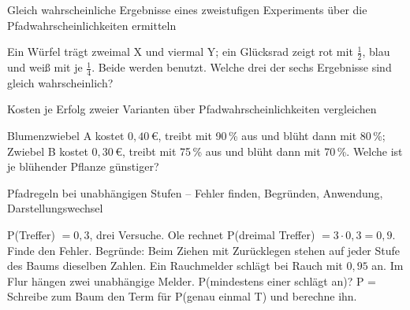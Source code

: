 \begin{aufgabe}{Gleich wahrscheinliche Ergebnisse eines zweistufigen Experiments über die Pfadwahrscheinlichkeiten ermitteln}
\begin{teile}
\teil Ein Würfel trägt zweimal X und viermal Y; ein Glücksrad zeigt rot mit $\frac{1}{2}$, blau und weiß mit je $\frac{1}{4}$. Beide werden benutzt. Welche drei der sechs Ergebnisse sind gleich wahrscheinlich?
\end{teile}
\end{aufgabe}

\begin{aufgabe}{Kosten je Erfolg zweier Varianten über Pfadwahrscheinlichkeiten vergleichen}
\begin{teile}
\teil Blumenzwiebel A kostet $0{,}40$\,€, treibt mit 90\,\% aus und blüht dann mit 80\,\%; Zwiebel B kostet $0{,}30$\,€, treibt mit 75\,\% aus und blüht dann mit 70\,\%. Welche ist je blühender Pflanze günstiger?
\end{teile}
\end{aufgabe}

\begin{aufgabe}{Pfadregeln bei unabhängigen Stufen – Fehler finden, Begründen, Anwendung, Darstellungswechsel}
\begin{teile}
\teil P(Treffer) $= 0{,}3$, drei Versuche. Ole rechnet P(dreimal Treffer) $= 3 \cdot 0{,}3 = 0{,}9$. Finde den Fehler.
\teil Begründe: Beim Ziehen mit Zurücklegen stehen auf jeder Stufe des Baums dieselben Zahlen.
\teil Ein Rauchmelder schlägt bei Rauch mit $0{,}95$ an. Im Flur hängen zwei unabhängige Melder. P(mindestens einer schlägt an)? P = \leerfeld
\teil Schreibe zum Baum den Term für P(genau einmal T) und berechne ihn.

\end{teile}
\end{aufgabe}

